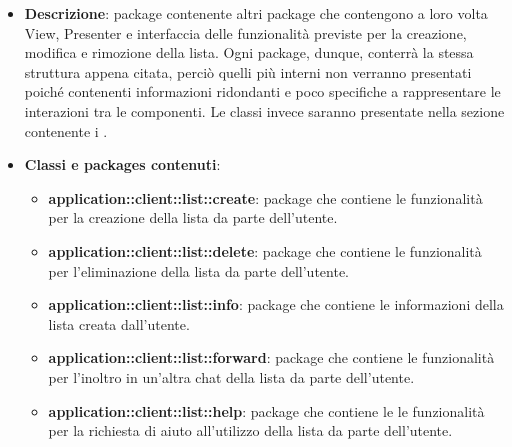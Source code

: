 \begin{itemize}
\item \textbf{Descrizione}: package contenente altri package che contengono a loro volta View, Presenter e interfaccia delle funzionalità previste per la creazione, modifica e rimozione della lista. Ogni package, dunque, conterrà la stessa struttura appena citata, perciò quelli più interni non verranno presentati poiché contenenti informazioni ridondanti e poco specifiche a rappresentare le interazioni tra le componenti. Le classi invece saranno presentate nella sezione contenente i .
	\item \textbf{Classi e packages contenuti}:
	\begin{itemize}
	\item \textbf{application::client::list::create}: package che contiene le funzionalità per la creazione della lista da parte dell'utente.
	\item \textbf{application::client::list::delete}: package che contiene le funzionalità per l'eliminazione della lista da parte dell'utente.
	\item \textbf{application::client::list::info}: package che contiene le informazioni della lista creata dall'utente.
	\item \textbf{application::client::list::forward}: package che contiene le funzionalità per l'inoltro in un'altra chat della lista da parte dell'utente.
	\item \textbf{application::client::list::help}: package che contiene le le funzionalità per la richiesta di aiuto all'utilizzo della lista da parte dell'utente.
	\end{itemize}
\end{itemize}

